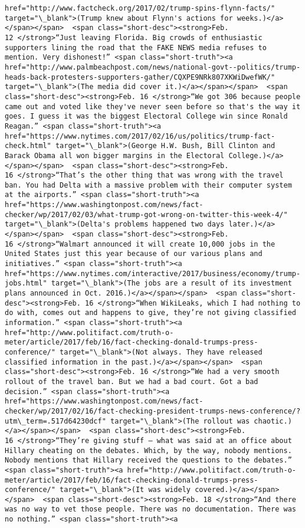 \documentclass[11pt]{article}
\begin{document}
\begin{Verbatim}[commandchars=\\\{\}]
href="http://www.factcheck.org/2017/02/trump-spins-flynn-facts/" target="\_blank">(Trump knew about Flynn's actions for weeks.)</a></span></span>  <span class="short-desc"><strong>Feb. 12 </strong>“Just leaving Florida. Big crowds of enthusiastic supporters lining the road that the FAKE NEWS media refuses to mention. Very dishonest!” <span class="short-truth"><a href="http://www.palmbeachpost.com/news/national-govt--politics/trump-heads-back-protesters-supporters-gather/CQXPE9NRk807XKWiDwefWK/" target="\_blank">(The media did cover it.)</a></span></span>  <span class="short-desc"><strong>Feb. 16 </strong>“We got 306 because people came out and voted like they've never seen before so that's the way it goes. I guess it was the biggest Electoral College win since Ronald Reagan.” <span class="short-truth"><a href="https://www.nytimes.com/2017/02/16/us/politics/trump-fact-check.html" target="\_blank">(George H.W. Bush, Bill Clinton and Barack Obama all won bigger margins in the Electoral College.)</a></span></span>  <span class="short-desc"><strong>Feb. 16 </strong>“That’s the other thing that was wrong with the travel ban. You had Delta with a massive problem with their computer system at the airports.” <span class="short-truth"><a href="https://www.washingtonpost.com/news/fact-checker/wp/2017/02/03/what-trump-got-wrong-on-twitter-this-week-4/" target="\_blank">(Delta's problems happened two days later.)</a></span></span>  <span class="short-desc"><strong>Feb. 16 </strong>“Walmart announced it will create 10,000 jobs in the United States just this year because of our various plans and initiatives.” <span class="short-truth"><a href="https://www.nytimes.com/interactive/2017/business/economy/trump-jobs.html" target="\_blank">(The jobs are a result of its investment plans announced in Oct. 2016.)</a></span></span>  <span class="short-desc"><strong>Feb. 16 </strong>“When WikiLeaks, which I had nothing to do with, comes out and happens to give, they’re not giving classified information.” <span class="short-truth"><a href="http://www.politifact.com/truth-o-meter/article/2017/feb/16/fact-checking-donald-trumps-press-conference/" target="\_blank">(Not always. They have released classified information in the past.)</a></span></span>  <span class="short-desc"><strong>Feb. 16 </strong>“We had a very smooth rollout of the travel ban. But we had a bad court. Got a bad decision.” <span class="short-truth"><a href="https://www.washingtonpost.com/news/fact-checker/wp/2017/02/16/fact-checking-president-trumps-news-conference/?utm\_term=.517d64230dcf" target="\_blank">(The rollout was chaotic.)</a></span></span>  <span class="short-desc"><strong>Feb. 16 </strong>“They’re giving stuff — what was said at an office about Hillary cheating on the debates. Which, by the way, nobody mentions. Nobody mentions that Hillary received the questions to the debates.” <span class="short-truth"><a href="http://www.politifact.com/truth-o-meter/article/2017/feb/16/fact-checking-donald-trumps-press-conference/" target="\_blank">(It was widely covered.)</a></span></span>  <span class="short-desc"><strong>Feb. 18 </strong>“And there was no way to vet those people. There was no documentation. There was no nothing.” <span class="short-truth"><a 
\end{Verbatim}
\end{document}
